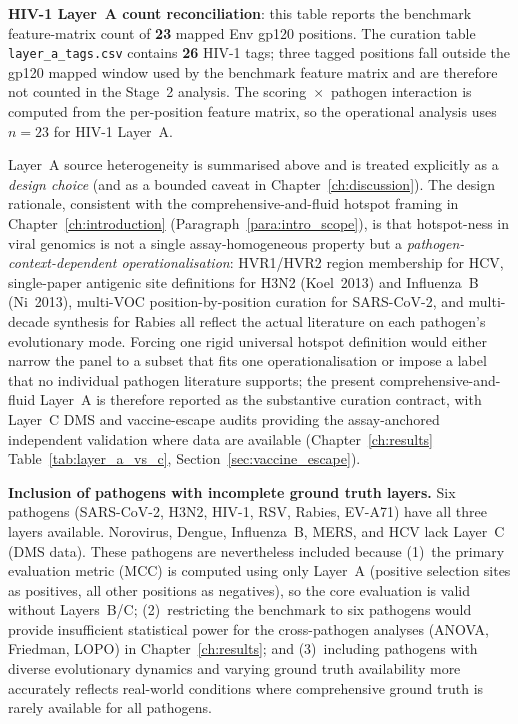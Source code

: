 \begin{table}[htbp]
\begin{minipage}{\textwidth}
\textbf{HIV-1 Layer~A count reconciliation}: this table reports the benchmark feature-matrix count of \textbf{23} mapped Env gp120 positions. The curation table \texttt{layer\_a\_tags.csv} contains \textbf{26} HIV-1 tags; three tagged positions fall outside the gp120 mapped window used by the benchmark feature matrix and are therefore not counted in the Stage~2 analysis. The scoring~$\times$~pathogen interaction is computed from the per-position feature matrix, so the operational analysis uses $n=23$ for HIV-1 Layer~A.

Layer~A source heterogeneity is summarised above and is treated explicitly as a \emph{design choice} (and as a bounded caveat in Chapter~\ref{ch:discussion}). The design rationale, consistent with the comprehensive-and-fluid hotspot framing in Chapter~\ref{ch:introduction} (Paragraph~\ref{para:intro_scope}), is that hotspot-ness in viral genomics is not a single assay-homogeneous property but a \emph{pathogen-context-dependent operationalisation}: HVR1/HVR2 region membership for HCV, single-paper antigenic site definitions for H3N2 (Koel~2013) and Influenza~B (Ni~2013), multi-VOC position-by-position curation for SARS-CoV-2, and multi-decade synthesis for Rabies all reflect the actual literature on each pathogen's evolutionary mode. Forcing one rigid universal hotspot definition would either narrow the panel to a subset that fits one operationalisation or impose a label that no individual pathogen literature supports; the present comprehensive-and-fluid Layer~A is therefore reported as the substantive curation contract, with Layer~C DMS and vaccine-escape audits providing the assay-anchored independent validation where data are available (Chapter~\ref{ch:results} Table~\ref{tab:layer_a_vs_c}, Section~\ref{sec:vaccine_escape}).

\textbf{Inclusion of pathogens with incomplete ground truth layers.}
Six pathogens (SARS-CoV-2, H3N2, HIV-1, RSV, Rabies, EV-A71) have all three layers available.
Norovirus, Dengue, Influenza~B, MERS, and HCV lack Layer~C (DMS data).
These pathogens are nevertheless included because (1)~the primary evaluation metric (MCC) is computed using only Layer~A (positive selection sites as positives, all other positions as negatives), so the core evaluation is valid without Layers~B/C;
(2)~restricting the benchmark to six pathogens would provide insufficient statistical power for the cross-pathogen analyses (ANOVA, Friedman, LOPO) in Chapter~\ref{ch:results};
and (3)~including pathogens with diverse evolutionary dynamics and varying ground truth availability more accurately reflects real-world conditions where comprehensive ground truth is rarely available for all pathogens.
\end{minipage}
\end{table}

